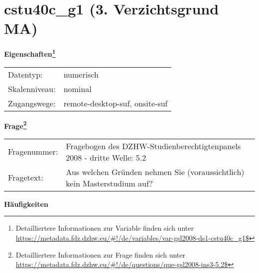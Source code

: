 
    \setcounter{footnote}{0}

    \vspace*{-1.8cm}
	\section{cstu40c\_g1 (3. Verzichtsgrund MA)}
	\label{section:cstu40c_g1}



    \vspace*{0.5cm}
    \noindent\textbf{Eigenschaften\footnote{Detailliertere Informationen zur Variable finden sich unter
		\url{https://metadata.fdz.dzhw.eu/\#!/de/variables/var-gsl2008-ds1-cstu40c_g1$}}}\\
	\begin{tabularx}{\hsize}{@{}lX}
	Datentyp: & numerisch \\
	Skalenniveau: & nominal \\
	Zugangswege: &
	  remote-desktop-suf, 
	  onsite-suf
 \\
    \end{tabularx}



				\vspace*{0.5cm}
                \noindent\textbf{Frage\footnote{Detailliertere Informationen zur Frage finden sich unter
		              \url{https://metadata.fdz.dzhw.eu/\#!/de/questions/que-gsl2008-ins3-5.2$}}}\\
				\begin{tabularx}{\hsize}{@{}lX}
					Fragenummer: &
					  Fragebogen des DZHW-Studienberechtigtenpanels 2008 - dritte Welle:
					  5.2
 \\
					Fragetext: & Aus welchen Gründen nehmen Sie (voraussichtlich) kein Masterstudium auf? \\
				\end{tabularx}





        		\vspace*{0.5cm}
                \noindent\textbf{Häufigkeiten}

